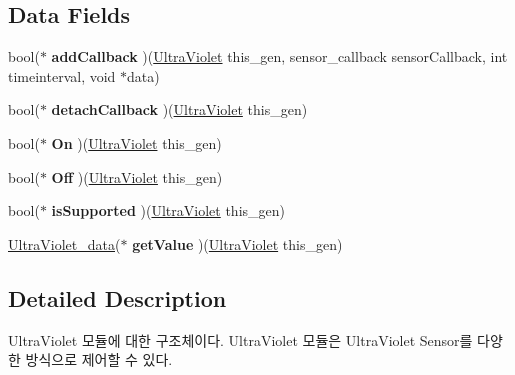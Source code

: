 \subsection*{Data Fields}
\begin{DoxyCompactItemize}
\item 
\hypertarget{struct__UltraViolet_a26573216a56632176537a8ce396d1273}{bool($\ast$ {\bfseries add\-Callback} )(\hyperlink{struct__UltraViolet}{Ultra\-Violet} this\-\_\-gen, sensor\-\_\-callback sensor\-Callback, int timeinterval, void $\ast$data)}\label{struct__UltraViolet_a26573216a56632176537a8ce396d1273}

\item 
\hypertarget{struct__UltraViolet_a929c7c6dd8943763c0c9ffeb1e7f9ea8}{bool($\ast$ {\bfseries detach\-Callback} )(\hyperlink{struct__UltraViolet}{Ultra\-Violet} this\-\_\-gen)}\label{struct__UltraViolet_a929c7c6dd8943763c0c9ffeb1e7f9ea8}

\item 
\hypertarget{struct__UltraViolet_a8f45e7067fd299fa74e795eefb2c26ae}{bool($\ast$ {\bfseries On} )(\hyperlink{struct__UltraViolet}{Ultra\-Violet} this\-\_\-gen)}\label{struct__UltraViolet_a8f45e7067fd299fa74e795eefb2c26ae}

\item 
\hypertarget{struct__UltraViolet_a096eedee01695ce097de63fc9f1c464d}{bool($\ast$ {\bfseries Off} )(\hyperlink{struct__UltraViolet}{Ultra\-Violet} this\-\_\-gen)}\label{struct__UltraViolet_a096eedee01695ce097de63fc9f1c464d}

\item 
\hypertarget{struct__UltraViolet_a3c866c9d5dac5b54f8dabd80f2111c4c}{bool($\ast$ {\bfseries is\-Supported} )(\hyperlink{struct__UltraViolet}{Ultra\-Violet} this\-\_\-gen)}\label{struct__UltraViolet_a3c866c9d5dac5b54f8dabd80f2111c4c}

\item 
\hypertarget{struct__UltraViolet_ad2f32aac4a27630b46e825c41eee7eb3}{\hyperlink{Sensor_8h_d9/dd3/struct__UltraViolet__data}{Ultra\-Violet\-\_\-data}($\ast$ {\bfseries get\-Value} )(\hyperlink{struct__UltraViolet}{Ultra\-Violet} this\-\_\-gen)}\label{struct__UltraViolet_ad2f32aac4a27630b46e825c41eee7eb3}

\end{DoxyCompactItemize}


\subsection{Detailed Description}
Ultra\-Violet 모듈에 대한 구조체이다. Ultra\-Violet 모듈은 Ultra\-Violet Sensor를 다양한 방식으로 제어할 수 있다. 

